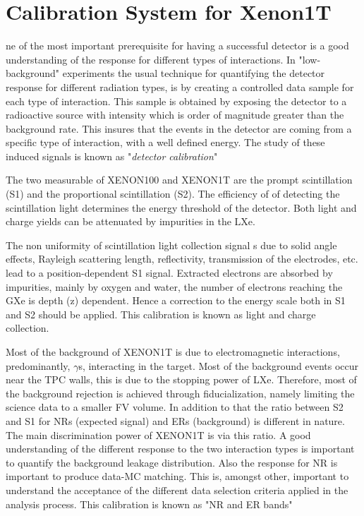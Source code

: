 %
%
\let\textcircled=\pgftextcircled

\chapter{Calibration System for Xenon1T} \label{chap:calib}

ne of the most important prerequisite for having a successful detector is a good understanding of the response for different types of interactions. In "low-background" experiments the usual technique for quantifying the detector response for different radiation types, is by creating a controlled data sample for each type of interaction. This sample is obtained by exposing the detector to a radioactive source with intensity which is order of magnitude greater than the background rate. This insures that the events in the detector are coming from a specific type of interaction, with a well defined energy. The study of these induced signals is known as "\textit{detector calibration}" 

The two measurable of XENON100 and XENON1T are the prompt scintillation (S1) and the proportional scintillation (S2). The efficiency of of detecting the scintillation light determines the energy threshold of the detector. Both light and charge yields can be attenuated by impurities in the LXe. 

The non uniformity of scintillation light collection signal s due to solid angle effects, Rayleigh scattering length, reflectivity, transmission of the electrodes, etc. lead to a
position-dependent S1 signal. Extracted electrons are absorbed by impurities, mainly by oxygen and water, the number of electrons reaching the GXe is depth (z) dependent. Hence a correction to the energy scale both in S1 and S2 should be applied. This calibration is known as light and charge collection. 

Most of the background of XENON1T is due to electromagnetic interactions, predominantly, $\gamma$s, interacting in the target. Most of the background events occur near the TPC walls, this is due to the stopping power of LXe. Therefore, most of the background rejection is achieved through fiducialization, namely limiting the science data to a smaller FV volume. In addition to that the ratio between S2 and S1 for NRs (expected signal) and ERs (background) is different in nature. The main discrimination power of XENON1T is via this ratio. A good understanding of the different response to the two interaction types is important to quantify the background leakage distribution. Also the response for NR is important to produce data-MC matching. This is, amongst other, important to understand the acceptance of the different data selection criteria applied in the analysis process. This calibration is known as "NR and ER bands"    

